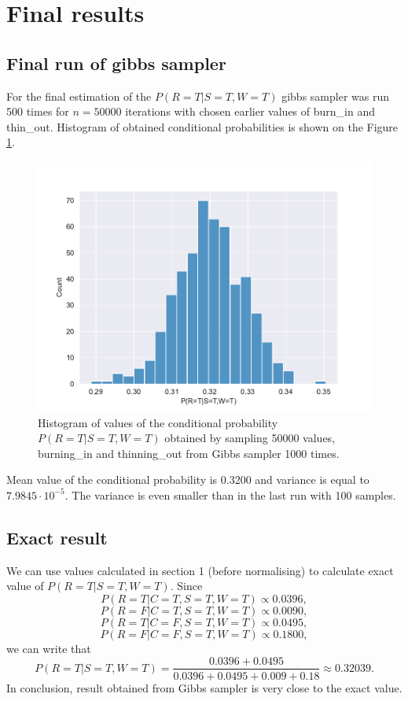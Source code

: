 \documentclass[a4paper,11pt]{article}
\begin{document}
\section{Final results}
\subsection{Final run of gibbs sampler}
For the final estimation of the $P(R=T|S=T,W=T)$ gibbs sampler was run 500 times for $n=50000$ iterations with chosen earlier values of burn\_in and thin\_out. Histogram of obtained conditional probabilities is shown on the Figure \ref{fig6}.
\begin{figure}[H]
    \centering
    \includegraphics[scale = 0.85]{Plots/histogram50000.pdf}
    \caption{Histogram of values of the conditional probability $P(R=T|S=T,W=T)$ obtained by sampling 50000 values, burning\_in and thinning\_out from Gibbs sampler 1000 times.}
    \label{fig6}
\end{figure}
\noindent Mean value of the conditional probability is 0.3200 and variance is equal to $7.9845\cdot10^{-5}$. The variance is even smaller than in the last run with 100 samples.
\subsection{Exact result}
We can use values calculated in section 1 (before normalising) to calculate exact value of $P(R=T|S=T,W=T)$. Since
\[
    P(R=T|C=T,S=T,W=T) \propto 0.0396,
\]
\[
    P(R=F|C=T,S=T,W=T) \propto 0.0090,
\]
\[
    P(R=T|C=F,S=T,W=T) \propto 0.0495,
\]
\[
    P(R=F|C=F,S=T,W=T) \propto 0.1800,
\]
we can write that
\begin{equation}
    P(R=T|S=T,W=T) = \frac{0.0396 + 0.0495}{0.0396 + 0.0495 + 0.009 + 0.18} \approx 0.32039.
\end{equation}
In conclusion, result obtained from Gibbs sampler is very close to the exact value.
\end{document}
